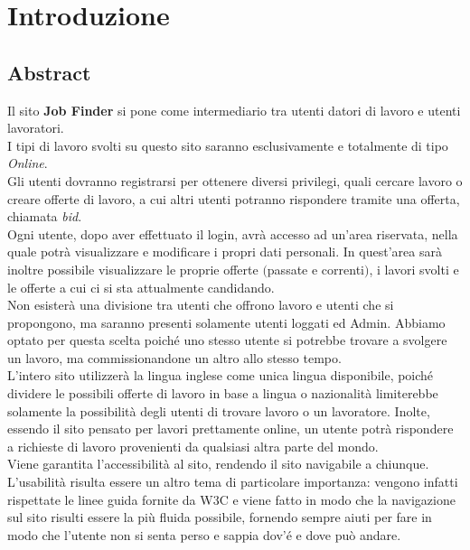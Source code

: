 \section{Introduzione}
	\subsection{Abstract}
	Il sito \textbf{Job Finder} si pone come intermediario tra utenti datori di lavoro e utenti lavoratori.\\
  I tipi di lavoro svolti su questo sito saranno esclusivamente e totalmente di tipo \textit{Online}. \\
	Gli utenti dovranno registrarsi per ottenere diversi privilegi, quali cercare lavoro o creare offerte di lavoro, a cui altri utenti potranno rispondere tramite una offerta, 
  chiamata \textit{bid}.\\
  Ogni utente, dopo aver effettuato il login, avrà accesso ad un'area riservata, nella quale potrà visualizzare e modificare i propri dati personali. In quest'area sarà inoltre 
  possibile visualizzare le proprie offerte $($passate e correnti$)$, i lavori svolti e le offerte a cui ci si sta attualmente candidando.\\
  Non esisterà una divisione tra utenti che offrono lavoro e utenti che si propongono, ma saranno presenti solamente utenti loggati ed Admin. Abbiamo optato per questa scelta poiché 
  uno stesso utente si potrebbe trovare a svolgere un lavoro, ma commissionandone un altro allo stesso tempo.\\
  L'intero sito utilizzerà la lingua inglese come unica lingua disponibile, poiché dividere le possibili offerte di lavoro in base a lingua o nazionalità limiterebbe solamente 
  la possibilità degli utenti di trovare lavoro o un lavoratore. Inolte, essendo il sito pensato per lavori prettamente online, un utente potrà rispondere a richieste di lavoro 
  provenienti da qualsiasi altra parte del mondo.\\
  Viene garantita l’accessibilità al sito, rendendo il sito navigabile a chiunque.\\
  L’usabilità risulta essere un altro tema di particolare importanza: vengono infatti rispettate le linee guida fornite da W3C e viene fatto in modo che la navigazione sul sito
  risulti essere la più fluida possibile, fornendo sempre aiuti per fare in modo che l’utente non si senta perso e sappia dov'é e dove può andare.
	